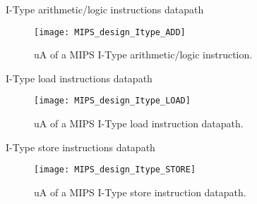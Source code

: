 \documentclass[]{slides}
\begin{document}
% 
\begin{frame}{I-Type arithmetic/logic instructions datapath}
  \begin{figure}
  \centering
  \texttt{[image: MIPS\_design\_Itype\_ADD]}
  \vspace{-3pt}
  \caption{\ac{uA} of a \ac{MIPS} I-Type arithmetic/logic instruction.}
  \label{Figure:non_pipelined_MIPS_Itype_ADD}
  \end{figure}
\end{frame}


% 


% 
\begin{frame}{I-Type load instructions datapath}
  \begin{figure}
  \centering
  \texttt{[image: MIPS\_design\_Itype\_LOAD]}
  \vspace{-3pt}
  \caption{\ac{uA} of a \ac{MIPS} I-Type load instruction datapath.}
  \label{Figure:non_pipelined_MIPS_Itype_LOAD}
  \end{figure}
\end{frame}

% 
\begin{frame}{I-Type store instructions datapath}
  \begin{figure}
  \centering
  \texttt{[image: MIPS\_design\_Itype\_STORE]}
  \vspace{-3pt}
  \caption{\ac{uA} of a \ac{MIPS} I-Type store instruction datapath.}
  \label{Figure:non_pipelined_MIPS_Itype_STORE}
  \end{figure}
\end{frame}
\end{document}
